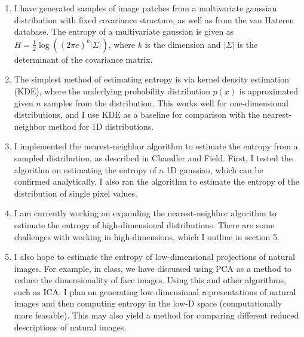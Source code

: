 \documentclass[10pt,twocolumn,letterpaper]{article}
\begin{document}
\begin{enumerate}
    \item I have generated samples of image patches from a multivariate gaussian distribution with fixed covariance structure, as well as from the van Hateren database. The entropy of a multivariate gaussian is given as $H = \frac{1}{2}\log\left((2\pi e)^k|\Sigma|\right)$, where $k$ is the dimension and $|\Sigma|$ is the determinant of the covariance matrix.
    \item The simplest method of estimating entropy is via kernel density estimation (KDE), where the underlying probability distribution $p(x)$ is approximated given $n$ samples from the distribution. This works well for one-dimensional distributions, and I use KDE as a baseline for comparison with the nearest-neighbor method for 1D distributions.
    \item I implemented the nearest-neighbor algorithm to estimate the entropy from a sampled distribution, as described in Chandler and Field. First, I tested the algorithm on estimating the entropy of a 1D gaussian, which can be confirmed analytically. I also ran the algorithm to estimate the entropy of the distribution of single pixel values.
    \item I am currently working on expanding the nearest-neighbor algorithm to estimate the entropy of high-dimensional distributions. There are some challenges with working in high-dimensions, which I outline in section 5.
    \item I also hope to estimate the entropy of low-dimensional projections of natural images. For example, in class, we have discussed using PCA as a method to reduce the dimensionality of face images. Using this and other algorithms, such as ICA, I plan on generating low-dimensional representations of natural images and then computing entropy in the low-D space (computationally more feasable). This may also yield a method for comparing different reduced descriptions of natural images.
\end{enumerate}


\end{document}
